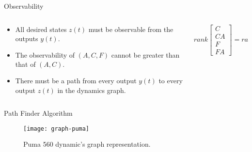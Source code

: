 \begin{slide}{Observability}
  \begin{columns}[c]
    \begin{column}{0.48\textwidth}
      \begin{itemize}
        \item All desired states \(z(t)\) must be observable from the outputs
              \(y(t)\).
        \item The observability of \((A,C,F)\) cannot be greater than that of
              \((A,C)\).
        \item There must be a path from every output \(y(t)\) to every output
              \(z(t)\) in the dynamics graph.
      \end{itemize}
    \end{column}%
    \hfill%
    \begin{column}{0.48\textwidth}
      \begin{equation}
        rank
        \begin{bmatrix}
          C \\ CA \\ F \\ FA
        \end{bmatrix}
        = rank
        \begin{bmatrix}
          C \\ CA \\ F
        \end{bmatrix}.
      \end{equation}
    \end{column}%
  \end{columns}
\end{slide}

\begin{slide}{Path Finder Algorithm}
  \begin{figure}[ht!]
    \centering
    \texttt{[image: graph-puma]}
    \caption{Puma 560 dynamic's graph representation.}%
    \label{fig:puma-graph}
  \end{figure}
\end{slide}
